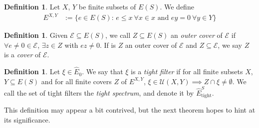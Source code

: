 \documentclass[12pt]{article}
\theoremstyle{definition}
\newtheorem{definition}[theorem]{Definition}
\begin{document}
\begin{definition} Let $X$, $Y$ be finite subsets of $E(S)$. We define
    \begin{align*} 
        E^{X, Y} &:= \{ e \in E(S) \text{: } e \leq x \ \forall x \in x \text{ and } ey = 0 \ \forall y \in Y \}
    \end{align*}
\end{definition}

\begin{definition}
    Given $\mathcal{E} \subseteq E(S)$, we call $Z \subseteq E(S)$ an \emph{outer cover} of $\mathcal{E}$ if
    $\forall e \neq 0 \in \mathcal{E}$, $\exists z \in Z$ with $ez \neq 0$. If is $Z$ an outer cover of $\mathcal{E}$ 
    and $Z \subseteq \mathcal{E}$, we say $Z$ is a \emph{cover} of $\mathcal{E}$.
\end{definition}

\begin{definition} 
    Let $\xi \in \hat{E}_0$. We say that $\xi$ is a \emph{tight filter} if for all finite subsets $X$, $Y \subseteq E(S)$
    and for all finite covers $Z$ of $E^{X, Y}$, $\xi \in \mathcal{U}(X, Y) \implies Z \cap \xi \neq \emptyset$. We call
    the set of tight filters the \emph{tight spectrum}, and denote it by $\hat{E}_{\text{tight}}^S$.
\end{definition}
This definition may appear a bit contrived, but the next theorem hopes to hint at its significance.
\end{document}
